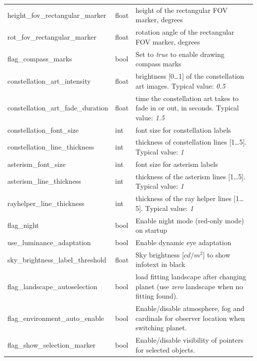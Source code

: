 \begin{longtable}{l|l|p{77mm}}
height\_fov\_rectangular\_marker & float & height of the rectangular FOV marker, degrees \\
rot\_fov\_rectangular\_marker    & float & rotation angle of the rectangular FOV marker, degrees \\
flag\_compass\_marks             & bool  & Set to \emph{true} to enable drawing compass marks \\
\midrule
constellation\_art\_intensity      & float & brightness [0\ldots1] of the constellation art images. Typical value: \emph{0.5}\\%
constellation\_art\_fade\_duration & float & time the constellation art takes to fade in or out, in seconds. Typical value: \emph{1.5}\\%
constellation\_font\_size          & int   & font size for constellation labels\\%
constellation\_line\_thickness     & int   & thickness of constellation lines [1\ldots5]. Typical value: \emph{1}\\%
asterism\_font\_size               & int   & font size for asterism labels\\%
asterism\_line\_thickness          & int   & thickness of the asterism lines [1\ldots5]. Typical value: \emph{1}\\%
rayhelper\_line\_thickness         & int   & thickness of the ray helper lines [1\ldots5]. Typical value: \emph{1}\\\midrule
flag\_night                        & bool  & Enable night mode (red-only mode) on startup\\\midrule
use\_luminance\_adaptation         & bool  & Enable dynamic eye adaptation\\\midrule %
sky\_brightness\_label\_threshold  & float & Sky brightness [$cd/m^2$] to show infotext in black \\\midrule  %
flag\_landscape\_autoselection     & bool  & load fitting landscape after changing planet (use \emph{zero} landscape when no fitting found).\\
flag\_environment\_auto\_enable    & bool  & Enable/disable atmosphere, fog and cardinals for observer location when switching planet.\\
flag\_show\_selection\_marker      & bool  & Enable/disable visibility of pointers for selected objects.\\
\bottomrule
\end{longtable}



